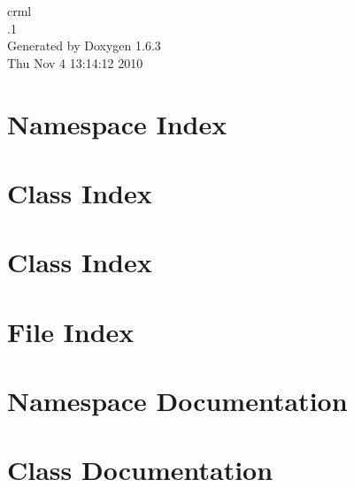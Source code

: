\documentclass[a4paper]{book}
\begin{document}
\hypersetup{pageanchor=false}
\begin{titlepage}
\vspace*{7cm}
\begin{center}
{\Large crml \\[1ex]\large .1 }\\
\vspace*{1cm}
{\large Generated by Doxygen 1.6.3}\\
\vspace*{0.5cm}
{\small Thu Nov 4 13:14:12 2010}\\
\end{center}
\end{titlepage}
\clearemptydoublepage
{}
\tableofcontents
\clearemptydoublepage
{}
\hypersetup{pageanchor=true}
\chapter{Namespace Index}

\chapter{Class Index}

\chapter{Class Index}

\chapter{File Index}

\chapter{Namespace Documentation}













\chapter{Class Documentation}
























\end{document}

